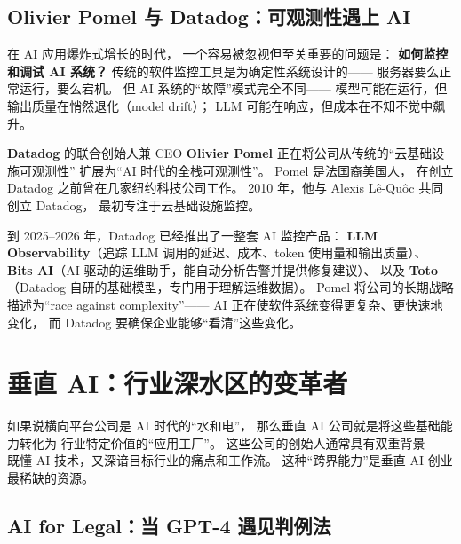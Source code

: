 \subsection{Olivier Pomel 与 Datadog：可观测性遇上 AI}
\label{subsec:olivier-pomel}

在 AI 应用爆炸式增长的时代，
一个容易被忽视但至关重要的问题是：
\textbf{如何监控和调试 AI 系统？}
传统的软件监控工具是为确定性系统设计的——
服务器要么正常运行，要么宕机。
但 AI 系统的``故障''模式完全不同——
模型可能在运行，但输出质量在悄然退化（model drift）；
LLM 可能在响应，但成本在不知不觉中飙升。

\textbf{Datadog} 的联合创始人兼 CEO \textbf{Olivier Pomel}
正在将公司从传统的``云基础设施可观测性''
扩展为``AI 时代的全栈可观测性''。
Pomel 是法国裔美国人，
在创立 Datadog 之前曾在几家纽约科技公司工作。
2010 年，他与 Alexis Lê-Quôc 共同创立 Datadog，
最初专注于云基础设施监控。

到 2025--2026 年，Datadog 已经推出了一整套 AI 监控产品：
\textbf{LLM Observability}（追踪 LLM 调用的延迟、成本、token 使用量和输出质量）、
\textbf{Bits AI}（AI 驱动的运维助手，能自动分析告警并提供修复建议）、
以及 \textbf{Toto}（Datadog 自研的基础模型，专门用于理解运维数据）。
Pomel 将公司的长期战略描述为``race against complexity''——
AI 正在使软件系统变得更复杂、更快速地变化，
而 Datadog 要确保企业能够``看清''这些变化。


\section{垂直 AI：行业深水区的变革者}
\label{sec:ent-vertical}

如果说横向平台公司是 AI 时代的``水和电''，
那么垂直 AI 公司就是将这些基础能力转化为
行业特定价值的``应用工厂''。
这些公司的创始人通常具有双重背景——
既懂 AI 技术，又深谙目标行业的痛点和工作流。
这种``跨界能力''是垂直 AI 创业最稀缺的资源。


\subsection{AI for Legal：当 GPT-4 遇见判例法}
\label{subsec:legal-ai}

